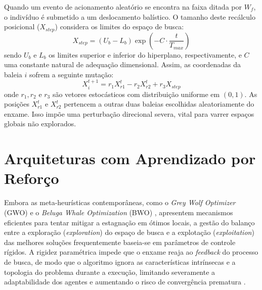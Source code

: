 \documentclass[12pt, a4paper, oneside]{report}
\begin{document}
Quando um evento de acionamento aleatório se encontra na faixa ditada por $W_f$, o indivíduo é submetido a um deslocamento balístico. O tamanho deste recálculo posicional ($X_{step}$) considera os limites do espaço de busca:
\begin{equation}
    X_{step} = (U_b - L_b) \exp\left(-C \cdot \frac{t}{T_{max}}\right)
\end{equation}
sendo $U_b$ e $L_b$ os limites superior e inferior do hiperplano, respectivamente, e $C$ uma constante natural de adequação dimensional. Assim, as coordenadas da baleia $i$ sofrem a seguinte mutação:
\begin{equation}
    X_i^{t+1} = r_1 X_{r1}^t - r_2 X_{r2}^t + r_3 X_{step}
\end{equation}
onde $r_1, r_2$ e $r_3$ são vetores estocásticos com distribuição uniforme em $(0, 1)$. As posições $X_{r1}^t$ e $X_{r2}^t$ pertencem a outras duas baleias escolhidas aleatoriamente do enxame. Isso impõe uma perturbação direcional severa, vital para varrer espaços globais não explorados.



\section{Arquiteturas com Aprendizado por Reforço}

Embora as meta-heurísticas contemporâneas, como o \textit{Grey Wolf Optimizer} (GWO) \cite{mirjalili2014grey} e o \textit{Beluga Whale Optimization} (BWO) \cite{zhong2022beluga}, apresentem mecanismos eficientes para tentar mitigar a estagnação em ótimos locais, a gestão do balanço entre a exploração (\textit{exploration}) do espaço de busca e a explotação (\textit{exploitation}) das melhores soluções frequentemente baseia-se em parâmetros de controle rígidos. A rigidez paramétrica impede que o enxame reaja ao \textit{feedback} do processo de busca, de modo que o algoritmo ignora as características intrínsecas e a topologia do problema durante a execução, limitando severamente a adaptabilidade dos agentes e aumentando o risco de convergência prematura \cite{somvanshi2025review}.
\end{document}
